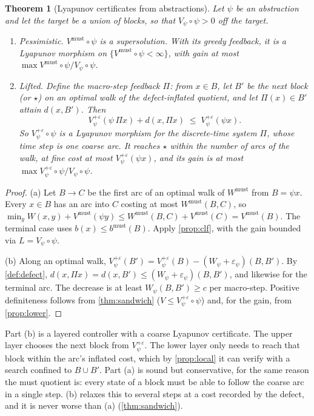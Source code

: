 \documentclass[11pt]{article}
\newtheorem{theorem}{Theorem}[section]
\theoremstyle{definition}
\theoremstyle{remark}
\newcommand{\eps}{\varepsilon}
\newcommand{\dd}{d}
\newcommand{\Wm}{W^{\mathrm{must}}}
\newcommand{\Vm}{V^{\mathrm{must}}}
\newcommand{\tgt}{\star}
\begin{document}
\begin{theorem}[Lyapunov certificates from abstractions]\label{thm:lyap-abstraction}
Let $\psi$ be an abstraction and let the target be a union of blocks, so that
$V_\psi \circ \psi > 0$ off the target.
\begin{enumerate}[label=(\alph*),nosep]
\item \emph{Pessimistic.} $\Vm \circ \psi$ is a supersolution. With its greedy
  feedback, it is a Lyapunov morphism on $\{\Vm \circ \psi < \infty\}$, with gain
  at most $\max \Vm\circ\psi / V_\psi \circ \psi$.
\item \emph{Lifted.} Define the macro-step feedback $\Pi$: from $x \in B$, let $B'$
  be the next block (or $\tgt$) on an optimal walk of the defect-inflated quotient,
  and let $\Pi(x) \in B'$ attain $\dd(x, B')$. Then
  \[ V^{+\eps}_\psi(\psi\, \Pi x) + \dd(x, \Pi x) \;\le\; V^{+\eps}_\psi(\psi x). \]
  So $V^{+\eps}_\psi \circ \psi$ is a Lyapunov morphism for the discrete-time
  system $\Pi$, whose time step is one coarse arc. It reaches $\tgt$ within the
  number of arcs of the walk, at fine cost at most $V^{+\eps}_\psi(\psi x)$, and its
  gain is at most $\max V^{+\eps}_\psi \circ\psi / V_\psi \circ \psi$.
\end{enumerate}
\end{theorem}
\begin{proof}
(a) Let $B \to C$ be the first arc of an optimal walk of $\Wm$ from $B = \psi x$.
Every $x \in B$ has an arc into $C$ costing at most $\Wm(B,C)$, so
$\min_y W(x,y) + \Vm(\psi y) \le \Wm(B,C) + \Vm(C) = \Vm(B)$. The terminal case uses
$b(x) \le b^{\mathrm{must}}(B)$. Apply \cref{prop:clf}, with the gain bounded via
$L = V_\psi \circ \psi$.

(b) Along an optimal walk, $V^{+\eps}_\psi(B') = V^{+\eps}_\psi(B) -
(W_\psi + \eps_\psi)(B,B')$. By \cref{def:defect},
$\dd(x, \Pi x) = \dd(x, B') \le (W_\psi + \eps_\psi)(B,B')$, and likewise for the
terminal arc. The decrease is at least $W_\psi(B,B') \ge c$ per macro-step.
Positive definiteness follows from \cref{thm:sandwich} ($V \le V^{+\eps}_\psi \circ
\psi$) and, for the gain, from \cref{prop:lower}.
\end{proof}

Part (b) is a layered controller with a coarse Lyapunov certificate. The upper
layer chooses the next block from $V^{+\eps}_\psi$. The lower layer only needs to
reach that block within the arc's inflated cost, which by \cref{prop:local} it can
verify with a search confined to $B \cup B'$. Part (a) is sound but conservative,
for the same reason the must quotient is: every state of a block must be able to
follow the coarse arc in a single step. (b) relaxes this to several steps at a
cost recorded by the defect, and it is never worse than (a) (\cref{thm:sandwich}).
\end{document}
